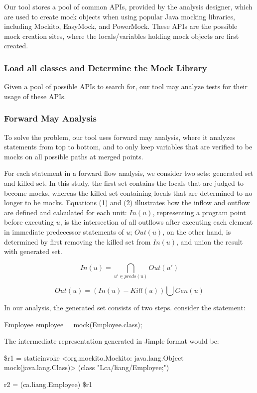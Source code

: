 Our tool stores a pool of common APIs, provided by the analysis designer, which are used to create mock objects when using popular Java mocking libraries, including Mockito, EasyMock, and PowerMock. These APIs are the possible mock creation sites, where the locals/variables holding mock objects are first created.

\subsubsection{Load all classes and Determine the Mock Library}
\label{subsubsec:library}

Given a pool of possible APIs to search for, our tool may analyze tests for their usage of these APIs.%


\subsubsection{Forward May Analysis}
\label{subsubsec:forward}

To solve the problem, our tool uses forward may analysis, where it analyzes statements from top to bottom, and to only keep variables that are verified to be mocks on all possible paths at merged points. 

For each statement in a forward flow analysis, we consider two sets: generated set and killed set. In this study, the first set contains the locals that are judged to become mocks, whereas the killed set containing locals that are determined to no longer to be mocks. Equations (1) and (2) illustrates how the inflow and outflow are defined and calculated for each unit: $In(u)$, representing a program point before executing $u$, is the intersection of all outflows after executing each element in immediate predecessor statements of $u$; $Out(u)$, on the other hand, is determined by first removing the killed set from $In(u)$, and union the result with generated set. 

\begin{equation}
In(u) = \bigcap_{u' \in preds(u)} Out(u') 
\end{equation}

\begin{equation}
Out(u) = (In(u) - Kill(u)) \bigcup Gen(u) 
\end{equation}

In our analysis, the generated set consists of two steps. consider the statement: 
\begin{verbatim*}
Employee employee = mock(Employee.class);
\end{verbatim*}
The intermediate representation generated in Jimple format would be:
\begin{verbatim*}
\$r1 = staticinvoke <org.mockito.Mockito: 
java.lang.Object mock(java.lang.Class)>
(class "Lca/liang/Employee;")

r2 = (ca.liang.Employee) \$r1
\end{verbatim*}

